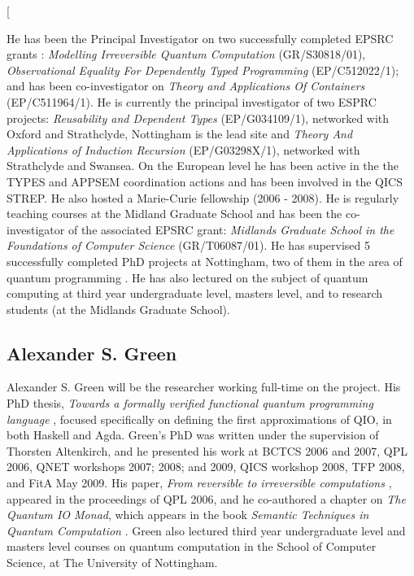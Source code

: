 \documentclass[a4paper]{article}
\begin{document}
\twocolumn[

He has been the Principal Investigator on two successfully completed
EPSRC grants : \emph{Modelling Irreversible Quantum Computation}
(GR/S30818/01), \emph{Observational Equality For Dependently Typed
  Programming} (EP/C512022/1); and has been co-investigator on
\emph{Theory and Applications Of Containers} (EP/C511964/1). 
He is currently the principal investigator of two ESPRC
projects: \emph{Reusability and Dependent Types} (EP/G034109/1), 
networked with
Oxford and Strathclyde, Nottingham is the lead site and 
\emph{Theory And Applications of Induction
  Recursion} (EP/G03298X/1), networked with Strathclyde and Swansea. 
On the European level he has been active in the the
TYPES and APPSEM coordination actions and has been involved in the
QICS STREP. He also hosted a Marie-Curie fellowship (2006 - 2008). He
is regularly teaching courses at the Midland Graduate School and has
been the co-investigator of the associated EPSRC grant: \emph{Midlands
  Graduate School in the Foundations of Computer Science}
(GR/T06087/01). He has supervised 5 successfully completed PhD
projects at Nottingham, two of them in the area of quantum
programming . He has also lectured 
on the subject of quantum computing at third year
undergraduate level, masters level, and to research students 
(at the Midlands Graduate School).

\subsection*{Alexander S. Green}
Alexander S. Green will be the researcher working full-time on the
project. His PhD thesis, \emph{Towards a formally verified functional
  quantum programming language} , focused
specifically on defining the first approximations of QIO, in both
Haskell and Agda. Green's PhD was written under the supervision of
Thorsten Altenkirch, and he presented his work at BCTCS 2006
and 2007, QPL 2006, QNET workshops 2007; 2008; and 2009, QICS workshop
2008, TFP 2008, and FitA May 2009. His paper, \emph{From reversible to
irreversible computations} , appeared in the
proceedings of QPL 2006, and he co-authored a chapter on \emph{The
Quantum IO Monad}, which appears in the book \emph{Semantic Techniques
in Quantum Computation} . Green also lectured third
year undergraduate level and masters level courses on quantum
computation in the School of Computer Science, at The University of
Nottingham. 
\end{document}
